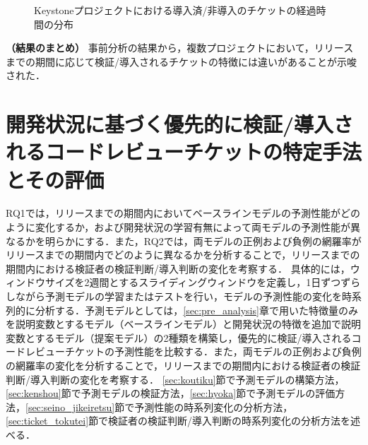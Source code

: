 \documentclass[11pt]{jreport}
\begin{document}
\begin{figure}[h]
\begin{center}
\caption{Keystoneプロジェクトにおける導入済/非導入のチケットの経過時間の分布}
\label{fig:merge_age}
\end{center}
\end{figure}

\textbf{（結果のまとめ）} 事前分析の結果から，複数プロジェクトにおいて，リリースまでの期間に応じて検証/導入されるチケットの特徴には違いがあることが示唆された．


\chapter{開発状況に基づく優先的に検証/導入されるコードレビューチケットの特定手法とその評価}\label{sec:analysis_method}

RQ1では，リリースまでの期間内においてベースラインモデルの予測性能がどのように変化するか，および開発状況の学習有無によって両モデルの予測性能が異なるかを明らかにする．また，RQ2では，両モデルの正例および負例の網羅率がリリースまでの期間内でどのように異なるかを分析することで，リリースまでの期間内における検証者の検証判断/導入判断の変化を考察する．
具体的には，ウィンドウサイズを2週間とするスライディングウィンドウを定義し，1日ずつずらしながら予測モデルの学習またはテストを行い，モデルの予測性能の変化を時系列的に分析する．予測モデルとしては，\ref{sec:pre_analysis}章で用いた特徴量のみを説明変数とするモデル（ベースラインモデル）と開発状況の特徴を追加で説明変数とするモデル（提案モデル）の2種類を構築し，優先的に検証/導入されるコードレビューチケットの予測性能を比較する．また，両モデルの正例および負例の網羅率の変化を分析することで，リリースまでの期間内における検証者の検証判断/導入判断の変化を考察する．
\ref{sec:koutiku}節で予測モデルの構築方法，\ref{sec:kenshou}節で予測モデルの検証方法，\ref{sec:hyoka}節で予測モデルの評価方法，\ref{sec:seino_jikeiretsu}節で予測性能の時系列変化の分析方法，\ref{sec:ticket_tokutei}節で検証者の検証判断/導入判断の時系列変化の分析方法を述べる．
\end{document}
